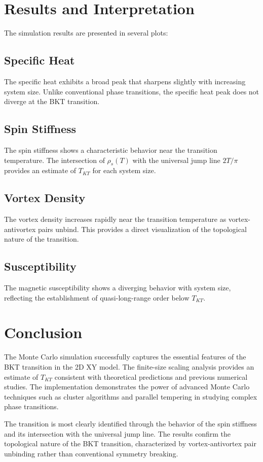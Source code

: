 \documentclass[12pt,a4paper]{article}
\begin{document}
\section{Results and Interpretation}

The simulation results are presented in several plots:

\subsection{Specific Heat}

The specific heat exhibits a broad peak that sharpens slightly with increasing system size. Unlike conventional phase transitions, the specific heat peak does not diverge at the BKT transition.

\subsection{Spin Stiffness}

The spin stiffness shows a characteristic behavior near the transition temperature. The intersection of $\rho_s(T)$ with the universal jump line $2T/\pi$ provides an estimate of $T_{KT}$ for each system size.

\subsection{Vortex Density}

The vortex density increases rapidly near the transition temperature as vortex-antivortex pairs unbind. This provides a direct visualization of the topological nature of the transition.

\subsection{Susceptibility}

The magnetic susceptibility shows a diverging behavior with system size, reflecting the establishment of quasi-long-range order below $T_{KT}$.

\section{Conclusion}

The Monte Carlo simulation successfully captures the essential features of the BKT transition in the 2D XY model. The finite-size scaling analysis provides an estimate of $T_{KT}$ consistent with theoretical predictions and previous numerical studies. The implementation demonstrates the power of advanced Monte Carlo techniques such as cluster algorithms and parallel tempering in studying complex phase transitions.

The transition is most clearly identified through the behavior of the spin stiffness and its intersection with the universal jump line. The results confirm the topological nature of the BKT transition, characterized by vortex-antivortex pair unbinding rather than conventional symmetry breaking.
\end{document}
